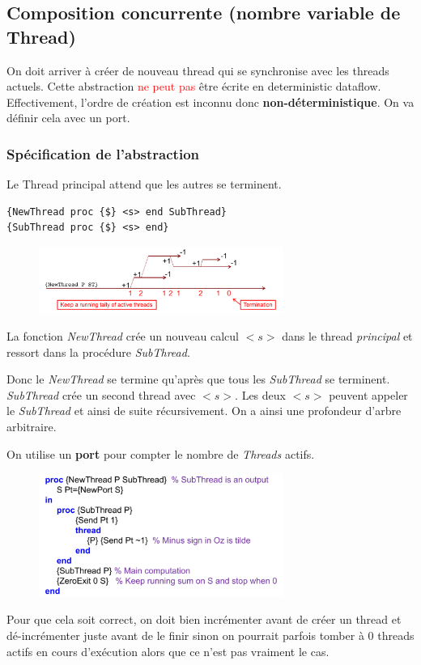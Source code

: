 \documentclass{report}
\begin{document}
\subsection{Composition concurrente (nombre variable de Thread)}
On doit arriver à créer de nouveau thread qui se synchronise avec les threads actuels. Cette abstraction \textcolor{red}{ne peut pas} être écrite en deterministic dataflow. Effectivement, l'ordre de création est inconnu donc \textbf{non-déterministique}. On va définir cela avec un port.

\subsubsection{Spécification de l'abstraction}
Le Thread principal attend que les autres se terminent. 
\begin{lstlisting}[escapechar=\%]
{NewThread proc {$} <s> end SubThread} 
{SubThread proc {$} <s> end}
\end{lstlisting}
\begin{figure}
\centering
\includegraphics[width=8cm]{img/newThread.png}
\end{figure}
La fonction \textit{NewThread} crée un nouveau calcul $<s>$ dans le thread \textit{principal} et ressort dans la procédure \textit{SubThread}.\par 
Donc le \textit{NewThread} se termine qu'après que tous les \textit{SubThread} se terminent. \textit{SubThread} crée un second thread avec $<s>$. Les deux $<s>$ peuvent appeler le \textit{SubThread} et ainsi de suite récursivement. On a ainsi une profondeur d'arbre arbitraire.\par 
On utilise un \textbf{port} pour compter le nombre de \textit{Threads} actifs. 
\begin{figure}[H]
\centering
\includegraphics[width=8cm]{img/newThreadImplementation.png}
\end{figure} 
Pour que cela soit correct, on doit bien incrémenter avant de créer un thread et dé-incrémenter juste avant de le finir sinon on pourrait parfois tomber à 0 threads actifs en cours d'exécution alors que ce n'est pas vraiment le cas.
\end{document}

